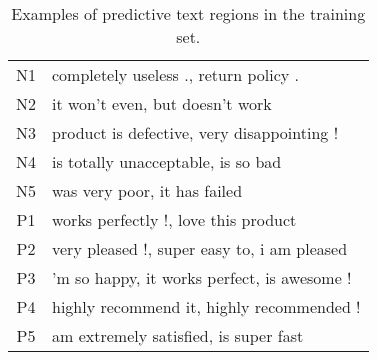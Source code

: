 \documentclass[11pt,letterpaper]{article}
\begin{document}
\begin{table}
\begin{center}
\begin{footnotesize}
\begin{tabular}{|c|p{2.5in}|} 
\hline
{\small N1} & {\small completely useless ., return policy .} \\
{\small N2} & {\small it won't even, but doesn't work} \\
{\small N3} & {\small product is defective, very disappointing !} \\
{\small N4} & {\small is totally unacceptable, is so bad} \\
{\small N5} & {\small was very poor, it has failed} \\
\hline
{\small P1} & {\small works perfectly !, love this product} \\
{\small P2} & {\small very pleased !, super easy to, i am pleased} \\
{\small P3} & {\small 'm so happy, it works perfect, is awesome !} \\
{\small P4} & {\small highly recommend it, highly recommended !} \\  {\small P5} & {\small am extremely satisfied, is super fast} \\
\hline
\end{tabular}
\end{footnotesize}
\vspace{-0.1in}
\caption{ \label{tab:bv} \small
Examples of predictive text regions in the training set. 
}
\end{center}
\end{table}
\end{document}
